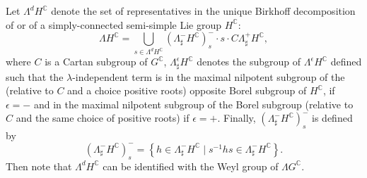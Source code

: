 \documentclass[12pt]{amsart}
\theoremstyle{definition}
\theoremstyle{remark}
\numberwithin{equation}{section}
\begin{document}
 Let $\Lambda^{d}H^{\mathbb C}$ denote the set of representatives in 
 the unique Birkhoff decomposition 
 of \cite[Corollary 5(c) ]{Kac-Pet} or \cite[Theorem 4.4]{BD1}
 of a simply-connected semi-simple Lie group
$H^{\mathbb C}$:
\begin{equation}
 \Lambda H^{\mathbb C} = \bigcup_{s\in \Lambda^{d}H^{\mathbb C}} 
(\Lambda^{-}_{\sharp} H^{\mathbb C})_s^{-} \cdot s \cdot \mathit C \Lambda^{+}_\sharp H^{\mathbb C},
\end{equation}
 where $\mathit C$ is  a Cartan subgroup of $G^{\mathbb C}$, 
 $\Lambda^{\epsilon}_\sharp H^{\mathbb C}$ denotes the 
 subgroup of $\Lambda^{\epsilon }H^{\mathbb C}$ defined such that 
 the  $\lambda$-independent term is in the maximal nilpotent subgroup of 
 the (relative to $\mathit C$ and a choice positive roots) 
 opposite Borel subgroup of $H^{\mathbb C}$, if $\epsilon = -$ 
 and in the maximal nilpotent subgroup of the Borel subgroup 
 (relative to $\mathit C$ and the same choice of positive roots)
 if $\epsilon = +$.
 Finally, $(\Lambda^{-}_{\sharp} H^{\mathbb C})_s^{-}$ is defined by 
\begin{equation*}
 (\Lambda^{-}_{\sharp} H^{\mathbb C})_s^{-} =
 \left\{
 h \in \Lambda^{-}_\sharp H^{\mathbb C}\;|\; 
 s^{-1} h s \in \Lambda^{-}_\sharp H^{\mathbb C}\right\}.
\end{equation*}
 Then note that 
 $\Lambda^{d}H^{\mathbb C}$ can be identified with the Weyl group of $\Lambda G^{\mathbb C}$.
\end{document}
